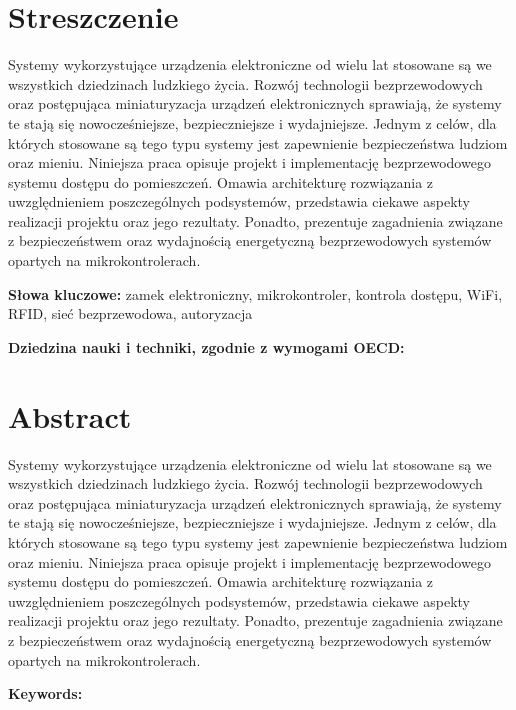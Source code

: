 \section*{Streszczenie}
	Systemy wykorzystujące urządzenia elektroniczne od wielu lat stosowane są we wszystkich dziedzinach ludzkiego życia. Rozwój technologii bezprzewodowych oraz postępująca miniaturyzacja urządzeń elektronicznych sprawiają, że systemy te stają się nowocześniejsze, bezpieczniejsze i wydajniejsze. Jednym z celów, dla których stosowane są tego typu systemy jest zapewnienie bezpieczeństwa ludziom oraz mieniu. Niniejsza praca opisuje projekt i implementację bezprzewodowego systemu dostępu do pomieszczeń. Omawia architekturę rozwiązania z uwzględnieniem poszczególnych podsystemów, przedstawia ciekawe aspekty realizacji projektu oraz jego rezultaty. Ponadto, prezentuje zagadnienia związane z bezpieczeństwem oraz wydajnością energetyczną bezprzewodowych systemów opartych na mikrokontrolerach.

	\textbf{Słowa kluczowe:} zamek elektroniczny, mikrokontroler, kontrola dostępu, WiFi, RFID, sieć bezprzewodowa, autoryzacja

	\textbf{Dziedzina nauki i techniki, zgodnie z wymogami OECD:}

\section*{Abstract}
	Systemy wykorzystujące urządzenia elektroniczne od wielu lat stosowane są we wszystkich dziedzinach ludzkiego życia. Rozwój technologii bezprzewodowych oraz postępująca miniaturyzacja urządzeń elektronicznych sprawiają, że systemy te stają się nowocześniejsze, bezpieczniejsze i wydajniejsze. Jednym z celów, dla których stosowane są tego typu systemy jest zapewnienie bezpieczeństwa ludziom oraz mieniu. Niniejsza praca opisuje projekt i implementację bezprzewodowego systemu dostępu do pomieszczeń. Omawia architekturę rozwiązania z uwzględnieniem poszczególnych podsystemów, przedstawia ciekawe aspekty realizacji projektu oraz jego rezultaty. Ponadto, prezentuje zagadnienia związane z bezpieczeństwem oraz wydajnością energetyczną bezprzewodowych systemów opartych na mikrokontrolerach.

	\textbf{Keywords:}